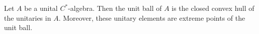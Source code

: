 \documentclass[12pt]{article}
\begin{document}
Let $A$ be a unital $C^*$-algebra. Then the unit ball of $A$ is the closed convex hull of the unitaries in $A$. Moreover, these unitary elements are extreme points of the unit ball.
\end{document}

